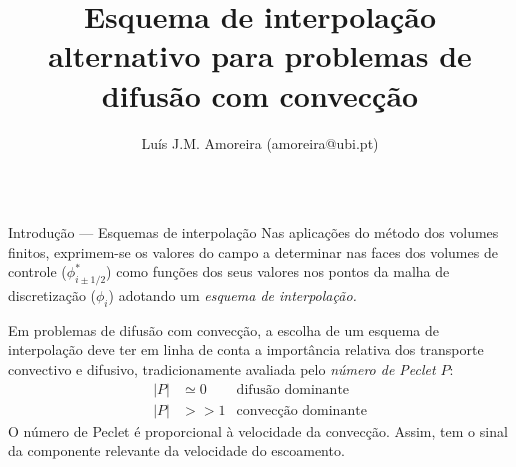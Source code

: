 \documentclass[final,t]{beamer}
\title{\LARGE Esquema de interpolação alternativo para problemas de difusão com
convecção}
\author{Luís J.M. Amoreira (amoreira@ubi.pt)}
\institute{Dep. Física, UBI}
\begin{document}
\begin{frame}{}
\begin{columns}[t]

\begin{column}{0.488\linewidth}
    \begin{block}{Introdução --- Esquemas de interpolação}
        Nas aplicações do método dos volumes finitos, exprimem-se os valores do
        campo a determinar nas faces dos volumes de controle
        ($\phi^*_{i\pm1/2}$) como funções dos seus valores nos pontos da malha
        de discretização ($\phi_i$) adotando um \emph{esquema de interpolação.}

        {\centering

        }
        Em problemas de difusão com convecção, a escolha de um esquema de
        interpolação deve ter em linha de conta a importância relativa dos
        transporte convectivo e difusivo, tradicionamente avaliada pelo 
        \emph{número de Peclet} $P$:
        \begin{equation*}
            \begin{aligned}
                |P|&\simeq0&\text{difusão dominante}\\
                |P|&>>1&\text{convecção dominante}
            \end{aligned}
        \end{equation*}
        O número de Peclet é proporcional à velocidade da convecção. Assim, tem
        o sinal da componente relevante da velocidade do escoamento.
    \end{block}


\end{column}
\end{columns}
\end{frame}
\end{document}
